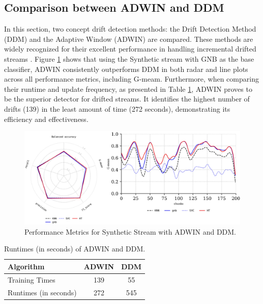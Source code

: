 \subsection{Comparison between ADWIN and DDM}
\label{sec:compared_drift_detector}
In this section, two concept drift detection methods: the Drift Detection Method (DDM) \cite{gama2004learning} and the Adaptive Window (ADWIN) \cite{gama2004learning, adams2023explainable} are compared. These methods are widely recognized for their excellent performance in handling incremental drifted streams \cite{gama2004learning, adams2023explainable, madkour2023historical, baena2006early}. Figure \ref{fig:res5} shows that using the Synthetic stream with GNB as the base classifier, ADWIN consistently outperforms DDM in both radar and line plots across all performance metrics, including G-meam. Furthermore, when comparing their runtime and update frequency, as presented in Table \ref{table:table_4}, ADWIN proves to be the superior detector for drifted streams. It identifies the highest number of drifts (139) in the least amount of time (272 seconds), demonstrating its efficiency and effectiveness.
\begin{figure}[!ht]
	\centering
	\includegraphics[width=1\linewidth]{5_Emerging/images/res4.png}
	\caption{Performance Metrics for Synthetic Stream with ADWIN and DDM.}

	\label{fig:res5}
\end{figure}
	
\begin{table}[!ht]
	\centering
	\caption{Runtimes (in seconds) of ADWIN and DDM.}
	\begin{tabular}{|l|c|c|}
		\hline
	\textbf{Algorithm}     & \textbf{ADWIN} & \textbf{DDM}  \\ \hline
Training Times         & 139          & 55                   \\ \hline
Runtimes (in seconds)         & 272          & 545                   \\ \hline
	
	\end{tabular}
	\label{table:table_4}
	\end{table}